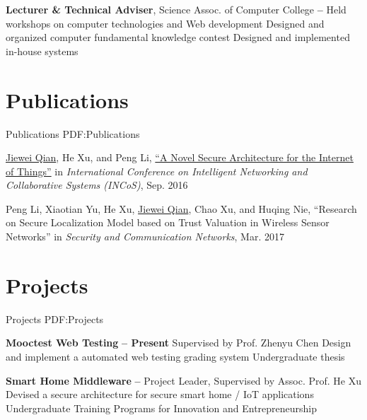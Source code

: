 \documentclass[a4paper,MMMyyyy,nonstop]{simpleresumecv}
\begin{document}
\begin{body}
\GapNoBreak

\textbf{Lecturer \& Technical Adviser}, Science Assoc. of Computer College
\hfill \textbf{
     -- 
}
\SubItem
Held workshops on computer technologies and Web development
\SubItem
Designed and organized computer fundamental knowledge contest
\SubItem
Designed and implemented in-house systems


\section
{Publications}
{Publications}
{PDF:Publications}

\underline{Jiewei Qian}, He Xu, and Peng Li,
\href{http://ieeexplore.ieee.org/document/7695208/}{``A Novel Secure Architecture for the Internet of Things''}{}
in \textit{International Conference on Intelligent Networking and Collaborative Systems (INCoS)}, Sep. 2016

\Gap

Peng Li, Xiaotian Yu, He Xu, \underline{Jiewei Qian}, Chao Xu, and Huqing Nie,
``Research on Secure Localization Model based on Trust Valuation in Wireless Sensor Networks''
in \textit{Security and Communication Networks}, Mar. 2017


\section
{Projects}
{Projects}
{PDF:Projects}

\textbf{Mooctest Web Testing}
\hfill \textbf{  -- Present }
\SubItem
Supervised by Prof. Zhenyu Chen
\SubItem
Design and implement a automated web testing grading system
\SubItem
Undergraduate thesis

\GapNoBreak

\textbf{Smart Home Middleware}
\hfill \textbf{  --  }
\SubItem
Project Leader, Supervised by Assoc. Prof. He Xu
\SubItem
Devised a secure architecture for secure smart home / IoT applications
\SubItem
Undergraduate Training Programs for Innovation and Entrepreneurship



\end{body}
\end{document}
